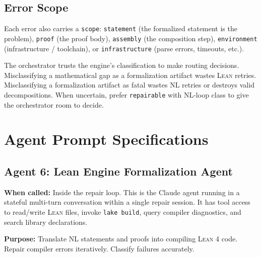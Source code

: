 \documentclass[11pt,a4paper]{article}
\newcommand{\Lean}{\textsc{Lean}}
\newcommand{\Claude}{Claude}
\begin{document}
\subsection{Error Scope}

Each error also carries a \texttt{scope}: \texttt{statement} (the formalized statement is the problem), \texttt{proof} (the proof body), \texttt{assembly} (the composition step), \texttt{environment} (infrastructure / toolchain), or \texttt{infrastructure} (parse errors, timeouts, etc.).

\begin{mustbox}
The orchestrator trusts the engine's classification to make routing decisions. Misclassifying a mathematical gap as a formalization artifact wastes \Lean{} retries. Misclassifying a formalization artifact as fatal wastes NL retries or destroys valid decompositions. When uncertain, prefer \texttt{repairable} with NL-loop class to give the orchestrator room to decide.
\end{mustbox}

\section{Agent Prompt Specifications}
\label{sec:prompts}

\subsection{Agent 6: Lean Engine Formalization Agent}

\textbf{When called:} Inside the repair loop. This is the \Claude{} agent running in a stateful multi-turn conversation within a single repair session. It has tool access to read/write \Lean{} files, invoke \texttt{lake build}, query compiler diagnostics, and search library declarations.

\textbf{Purpose:} Translate NL statements and proofs into compiling \Lean{} 4 code. Repair compiler errors iteratively. Classify failures accurately.
\end{document}

